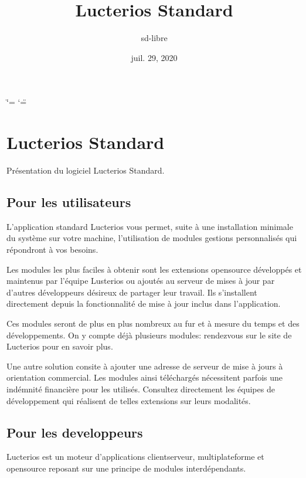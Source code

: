 \documentclass[letterpaper,10pt,french]{sphinxmanual}
\title{Lucterios Standard}
\date{juil. 29, 2020}
\author{sd-libre}
\begin{document}
\ifdefined\shorthandoff
  \ifnum\catcode`\=\string=\active\shorthandoff{=}\fi
  \ifnum\catcode`\"=\active{}\fi
\fi

\pagestyle{empty}
\sphinxmaketitle
\pagestyle{plain}
\sphinxtableofcontents
\pagestyle{normal}
\label{\detokenize{index::doc}}



\chapter{Lucterios Standard}
\label{\detokenize{standard/index:lucterios-standard}}\label{\detokenize{standard/index::doc}}
Présentation du logiciel Lucterios Standard.


\section{Pour les utilisateurs}
\label{\detokenize{standard/index:pour-les-utilisateurs}}
L’application standard Lucterios vous permet, suite à une installation minimale du système sur votre machine, l’utilisation de modules gestions personnalisés qui répondront à vos besoins.

Les modules les plus faciles à obtenir sont les extensions open\sphinxhyphen{}source développés et maintenus par l’équipe Lusterios ou ajoutés au serveur de mises à jour par d’autres développeurs désireux de partager leur travail. Ils s’installent directement depuis la fonctionnalité de mise à jour inclus dans l’application.

Ces modules seront de plus en plus nombreux au fur et à mesure du temps et des développements. On y compte déjà plusieurs modules: rendez\sphinxhyphen{}vous sur le site de Lucterios pour en savoir plus.

Une autre solution consite à ajouter une adresse de serveur de mise à jours à orientation commercial. Les modules ainsi téléchargés nécessitent parfois une indémnité financière pour les utilisés. Consultez directement les équipes de développement qui réalisent de telles extensions sur leurs modalités.


\section{Pour les developpeurs}
\label{\detokenize{standard/index:pour-les-developpeurs}}
Lucterios est un moteur d’applications client\sphinxhyphen{}serveur, multi\sphinxhyphen{}plateforme et open\sphinxhyphen{}source reposant sur une principe de modules interdépendants.
\end{document}
